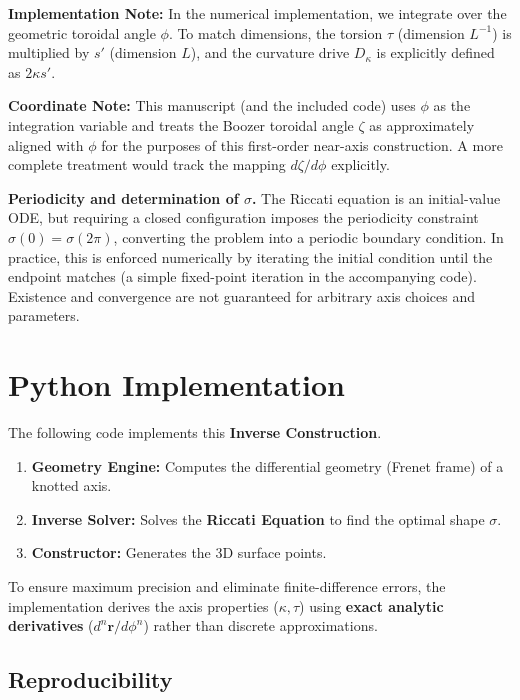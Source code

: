 \documentclass{article}
\begin{document}
\textbf{Implementation Note:} In the numerical implementation, we integrate over the geometric toroidal angle $\phi$. To match dimensions, the torsion $\tau$ (dimension $L^{-1}$) is multiplied by $s'$ (dimension $L$), and the curvature drive $D_\kappa$ is explicitly defined as $2\kappa s'$.

\textbf{Coordinate Note:} This manuscript (and the included code) uses $\phi$ as the integration variable and treats the Boozer toroidal angle $\zeta$ as approximately aligned with $\phi$ for the purposes of this first-order near-axis construction. A more complete treatment would track the mapping $d\zeta/d\phi$ explicitly.

\textbf{Periodicity and determination of $\sigma$.} The Riccati equation is an initial-value ODE, but requiring a closed configuration imposes the periodicity constraint $\sigma(0)=\sigma(2\pi)$, converting the problem into a periodic boundary condition. In practice, this is enforced numerically by iterating the initial condition until the endpoint matches (a simple fixed-point iteration in the accompanying code). Existence and convergence are not guaranteed for arbitrary axis choices and parameters.

\section{Python Implementation}

The following code implements this \textbf{Inverse Construction}.

\begin{enumerate}
    \item \textbf{Geometry Engine:} Computes the differential geometry (Frenet frame) of a knotted axis.
    \item \textbf{Inverse Solver:} Solves the \textbf{Riccati Equation} to find the optimal shape $\sigma$.
    \item \textbf{Constructor:} Generates the 3D surface points.
\end{enumerate}

To ensure maximum precision and eliminate finite-difference errors, the implementation derives the axis properties ($\kappa, \tau$) using \textbf{exact analytic derivatives} ($d^n\mathbf{r}/d\phi^n$) rather than discrete approximations.



\subsection{Reproducibility}
\end{document}
